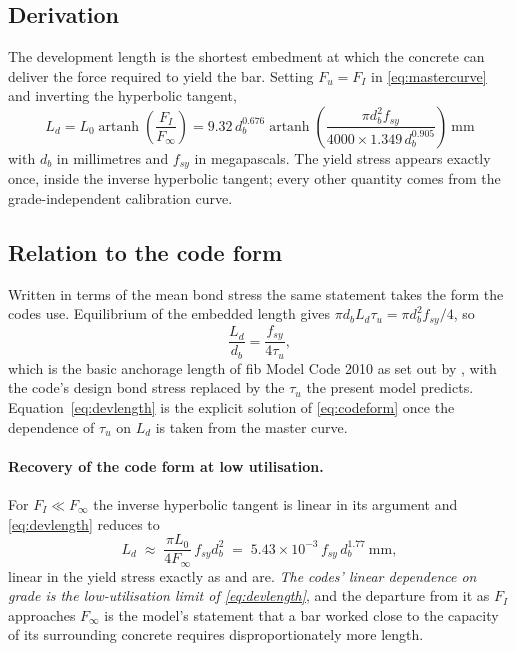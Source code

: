 \subsection{Derivation}

The development length is the shortest embedment at which the concrete can
deliver the force required to yield the bar. Setting $F_u = F_I$ in
\eqref{eq:mastercurve} and inverting the hyperbolic tangent,
\begin{equation}
\label{eq:devlength}
\boxed{\;
L_d = L_0 \operatorname{artanh}\!\left(\frac{F_I}{F_\infty}\right)
    = 9.32\, d_b^{0.676}
      \operatorname{artanh}\!\left(
        \frac{\pi d_b^{2} f_{sy}}{4000 \times 1.349\, d_b^{0.905}}
      \right)\ \si{\milli\metre}
\;}
\end{equation}
with $d_b$ in millimetres and $f_{sy}$ in megapascals. The yield stress
appears exactly once, inside the inverse hyperbolic tangent; every other
quantity comes from the grade-independent calibration curve.

\subsection{Relation to the code form}

Written in terms of the mean bond stress the same statement takes the form
the codes use. Equilibrium of the embedded length gives
$\pi d_b L_d \tau_u = \pi d_b^2 f_{sy}/4$, so
\begin{equation}
\label{eq:codeform}
\frac{L_d}{d_b} = \frac{f_{sy}}{4 \tau_u},
\end{equation}
which is the basic anchorage length of fib Model Code 2010 as set out by
\textcite{cairnsBondAnchorageEmbedded2015}, with the code's design bond
stress replaced by the $\tau_u$ the present model predicts.
Equation~\eqref{eq:devlength} is the explicit solution of
\eqref{eq:codeform} once the dependence of $\tau_u$ on $L_d$ is taken from
the master curve.

\paragraph{Recovery of the code form at low utilisation.}
For $F_I \ll F_\infty$ the inverse hyperbolic tangent is linear in its
argument and \eqref{eq:devlength} reduces to
\begin{equation}
\label{eq:devlinear}
L_d \;\approx\; \frac{\pi L_0}{4 F_\infty}\, f_{sy} d_b^2
   \;=\; 5.43\times10^{-3}\, f_{sy}\, d_b^{1.77}\ \si{\milli\metre},
\end{equation}
linear in the yield stress exactly as
\textcite{as3600ConcreteStructures2018} and
\textcite{cairnsBondAnchorageEmbedded2015} are. \emph{The codes' linear
dependence on grade is the low-utilisation limit of
\eqref{eq:devlength}}, and the departure from it as $F_I$ approaches
$F_\infty$ is the model's statement that a bar worked close to the capacity
of its surrounding concrete requires disproportionately more length.

